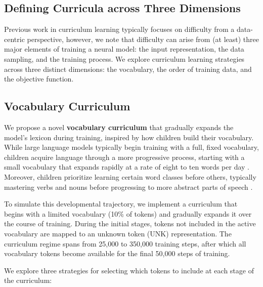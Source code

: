 \subsection{Defining Curricula across Three Dimensions}
Previous work in curriculum learning typically focuses on difficulty from a data-centric perspective, however, we note that difficulty can arise from (at least) three major elements of training a neural model: the input representation, the data sampling, and the training process. We explore curriculum learning strategies across three distinct dimensions: the vocabulary, the order of training data, and the objective function.

\subsection{Vocabulary Curriculum}
\label{subsec:vocab-cl}

We propose a novel \textbf{vocabulary curriculum} that gradually expands the model's lexicon during training, inspired by how children build their vocabulary. While large language models typically begin training with a full, fixed vocabulary, children acquire language through a more progressive process, starting with a small vocabulary that expands rapidly at a rate of eight to ten words per day \cite{weizman2001lexical}. Moreover, children prioritize learning certain word classes before others, typically mastering verbs and nouns before progressing to more abstract parts of speech \cite{bergelson2015early}.

To simulate this developmental trajectory, we implement a curriculum that begins with a limited vocabulary (10\% of tokens) and gradually expands it over the course of training. During the initial stages, tokens not included in the active vocabulary are mapped to an unknown token (\textsc{UNK}) representation. The curriculum regime spans from 25,000 to 350,000 training steps, after which all vocabulary tokens become available for the final 50,000 steps of training.

We explore three strategies for selecting which tokens to include at each stage of the curriculum:

